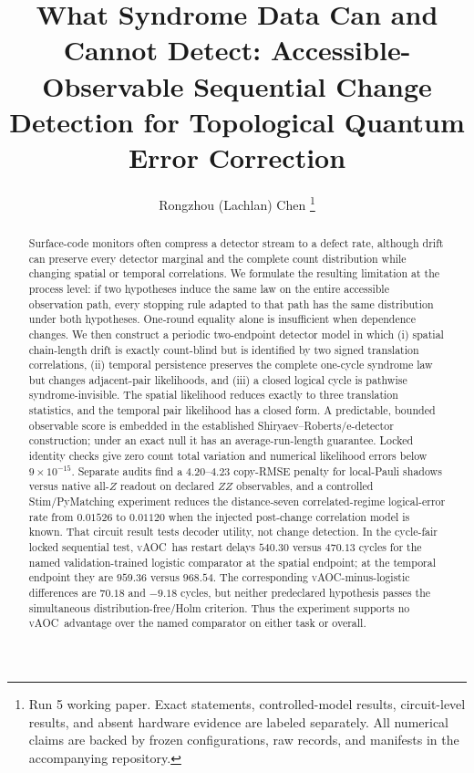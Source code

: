 \documentclass[letterpaper,journal]{IEEEtran}
\newcommand{\vAOC}{\textsc{vAOC}}
\begin{document}
\title{What Syndrome Data Can and Cannot Detect:
Accessible-Observable Sequential Change Detection for
Topological Quantum Error Correction}

\author{Rongzhou (Lachlan) Chen%
\thanks{Run 5 working paper. Exact statements, controlled-model results,
circuit-level results, and absent hardware evidence are labeled separately.
All numerical claims are backed by frozen configurations, raw records, and
manifests in the accompanying repository.}}

\maketitle

\begin{abstract}
Surface-code monitors often compress a detector stream to a defect rate,
although drift can preserve every detector marginal and the complete count
distribution while changing spatial or temporal correlations. We formulate
the resulting limitation at the process level: if two hypotheses induce the
same law on the entire accessible observation path, every stopping rule
adapted to that path has the same distribution under both hypotheses.
One-round equality alone is insufficient when dependence changes. We then
construct a periodic two-endpoint detector model in which (i) spatial
chain-length drift is exactly count-blind but is identified by two signed
translation correlations, (ii) temporal persistence preserves the complete
one-cycle syndrome law but changes adjacent-pair likelihoods, and (iii) a
closed logical cycle is pathwise syndrome-invisible. The spatial likelihood
reduces exactly to three translation statistics, and the temporal pair
likelihood has a closed form. A predictable, bounded observable score is
embedded in the established Shiryaev--Roberts/e-detector construction; under
an exact null it has an average-run-length guarantee. Locked identity checks
give zero count total variation and numerical likelihood errors below
$9\times10^{-15}$. Separate audits find a $4.20$--$4.23$ copy-RMSE penalty
for local-Pauli shadows versus native all-$Z$ readout on declared $ZZ$
observables, and a controlled Stim/PyMatching experiment reduces the
distance-seven correlated-regime logical-error rate from $0.01526$ to
$0.01120$ when the injected post-change correlation model is known.
That circuit result tests decoder utility, not change detection. In the
cycle-fair locked sequential test, \vAOC\ has restart delays $540.30$ versus
$470.13$ cycles for the named validation-trained logistic comparator at the
spatial endpoint; at the temporal endpoint they are $959.36$ versus $968.54$.
The corresponding \vAOC-minus-logistic differences are $70.18$ and $-9.18$
cycles, but neither predeclared hypothesis passes the simultaneous
distribution-free/Holm criterion. Thus the experiment supports no \vAOC\
advantage over the named comparator on either task or overall.
\end{abstract}
\end{document}
